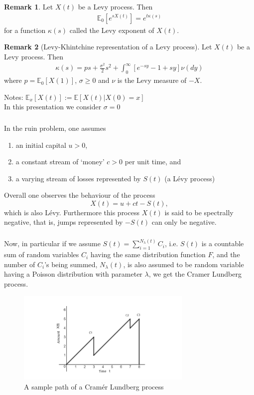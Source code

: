 \documentclass[xcolor=pdftex,dvipsnames,table]{beamer}
\theoremstyle{definition}
\newtheorem*{rmk}{Remark}
\def\enumb{\begin{enumerate}}
\def\enume{\end{enumerate}}
\def\mbbE{\mathbb{E}}
\begin{document}
\begin{frame}
\frametitle{\insertsectionhead}
\begin{rmk}
Let $X(t)$ be a Levy process. Then
\begin{align*}
\mbbE_0 [e^{sX(t)}] = e^{t\kappa(s)}
\label{LevyExp}
\end{align*}
for a function $\kappa(s)$ called the Levy exponent of $X(t)$. 
\end{rmk}
\begin{rmk}[Levy-Khintchine representation of a Levy process]
Let $X(t)$ be a Levy process. Then
\begin{align*}
\kappa(s) = ps + \frac{\sigma^2}{2} s^2 + \int_0^{\infty} [e^{-sy}-1 +sy ] \nu(dy)
\end{align*}
where $p=\mbbE_0[X(1)]$, $\sigma \geq 0$ and $\nu$ is the Levy measure of $-X$.
\end{rmk}
Notes: $\mbbE_x [X(t)] := \mbbE [X(t) | X(0)=x]$\\
In this presentation we consider $\sigma=0$
\end{frame}

\begin{frame}
\frametitle{\insertsectionhead}
In the ruin problem, one assumes
\enumb
\item an initial capital $u>0$,
\item a constant stream of `money' $c>0$ per unit time, and
\item a varying stream of losses represented by $S(t)$ (a L\'evy process)
\enume \pause
Overall  one observes the behaviour of the process
\[ X(t) = u + ct - S(t), \]
which is also L\'evy. Furthermore this process $X(t)$ is said to be spectrally negative, that is, jumps represented by $-S(t)$ can only be negative.
\end{frame}

\begin{frame}
\frametitle{\insertsectionhead}
Now, in particular if we assume $S(t) = \sum_{i=1}^{N_{\lambda}(t)} C_i$, i.e. $S(t)$ is a countable sum of random variables $C_i$ having the same distribution function $F$, and the number of $C_i$'s being summed, $N_{\lambda}(t)$, is also assumed to be random variable having a Poisson distribution with parameter $\lambda$, we get the Cramer Lundberg process.
\begin{figure}
\caption{A sample path of a Cram\'er Lundberg process}
\begin{center}
\includegraphics [width=3.3in]{CL1-1.png}
\end{center}
\end{figure}
\end{frame}
\end{document}
